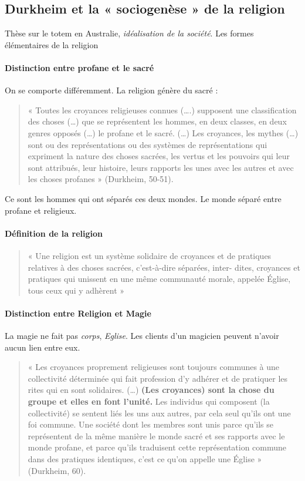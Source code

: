 \subsection{Durkheim et la « sociogenèse » de la religion }

Thèse sur le totem en Australie, \textit{idéalisation de la société}. 
Les formes élémentaires de la religion

\paragraph{Distinction entre profane et le sacré} On se comporte différemment. La religion génère du sacré : 
\begin{quote}
    « Toutes les croyances religieuses connues (….) supposent une classification  des choses (…) que se représentent les hommes, en deux classes, en deux genres opposés (…) le profane et le sacré. (…) Les croyances, les mythes (…) sont ou des représentations ou des systèmes de représentations qui expriment la nature des choses sacrées, les vertus et les pouvoirs qui leur sont attribués, leur histoire, leurs rapports les unes avec les autres et avec les choses profanes » (Durkheim, 50-51).  
\end{quote}

Ce sont les hommes qui ont séparés ces deux mondes. Le monde séparé entre profane et religieux.

\paragraph{Définition de la religion}
\begin{quote}
« Une religion est un système solidaire de croyances et de pratiques relatives à des choses sacrées, c’est-à-dire séparées, inter-
dites, croyances et pratiques qui unissent en une même communauté
morale, appelée Église, tous ceux qui y adhèrent »
\end{quote}

\paragraph{Distinction entre Religion et Magie}
La magie ne fait pas \textit{corps}, \textit{Eglise}. Les clients d'un magicien peuvent n'avoir aucun lien entre eux. 
\begin{quote}
    « Les croyances proprement religieuses sont toujours communes à une collectivité déterminée qui fait profession d’y adhérer et de pratiquer les rites qui en sont solidaires. (…) \textbf{(Les croyances) sont la chose du groupe et elles en font l’unité.} Les  individus qui composent (la collectivité) se sentent liés les uns aux autres, par cela seul qu’ils ont une foi commune. Une société dont les membres sont unis parce qu’ils se représentent de la même manière le monde sacré et ses rapports avec le monde profane, et parce qu’ils traduisent cette représentation commune dans des pratiques identiques, c’est ce qu’on appelle une Église » (Durkheim, 60). 
\end{quote}

